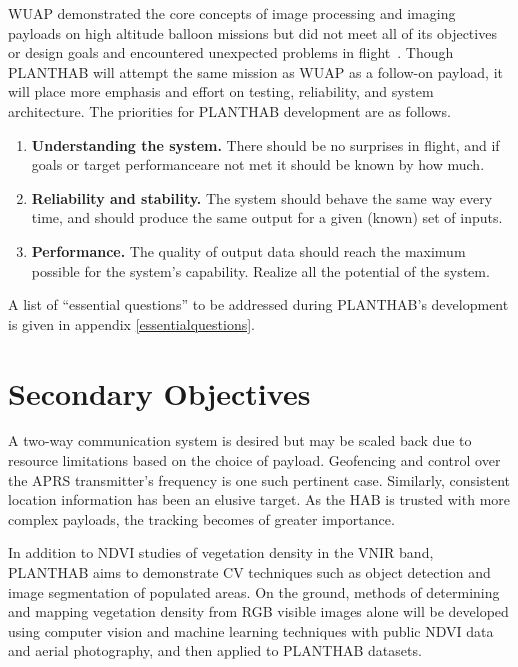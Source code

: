 \documentclass[conference]{IEEEtran} %
\begin{document}
WUAP demonstrated the core concepts of image processing and imaging payloads on high altitude balloon missions but did not meet all of its objectives or design goals and encountered unexpected problems in flight~\cite[Post-Flight Analysis]{wuaphab4}. 
Though PLANTHAB will attempt the same mission as WUAP as a follow-on payload, it will place more emphasis and effort on testing, reliability, and system architecture. 
The priorities for PLANTHAB development are as follows. 
\begin{enumerate}\small
    \item \textbf{Understanding the system.} There should be no surprises in flight, and if goals or target performanceare not met it should be known by how much.
    \item \textbf{Reliability and stability.} The system should behave the same way every time, and should produce the same output for a given (known) set of inputs.
    \item \textbf{Performance.} The quality of output data should reach the maximum possible for the system's capability. Realize all the potential of the system.
\end{enumerate}

A list of ``essential questions'' to be addressed during PLANTHAB's development is given in appendix \ref{essentialquestions}.


\section{Secondary Objectives}
\label{secondaryobjectives}
A two-way communication system is desired but may be scaled back due to resource limitations based on the choice of payload. Geofencing and control over the APRS transmitter's frequency is one such pertinent case.
Similarly, consistent location information has been an elusive target. 
As the HAB is trusted with more complex payloads, the tracking becomes of greater importance.
 
In addition to NDVI studies of vegetation density in the VNIR band, PLANTHAB aims to demonstrate CV techniques such as object detection and image segmentation of populated areas. 
On the ground, methods of determining and mapping vegetation density from RGB visible images alone will be developed using computer vision and machine learning techniques with public NDVI data and aerial photography, and then applied to PLANTHAB datasets. 
\end{document}
